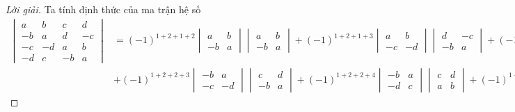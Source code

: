 \documentclass[class=nhvh-linear-algebra,crop=false]{standalone}
\begin{document}
\begin{proof}[Lời giải]
	\par Ta tính định thức của ma trận hệ số
	\begingroup{}
	\allowdisplaybreaks{}
	\begin{align*}
		\begin{vmatrix}
			a  & b  & c  & d  \\
			-b & a  & d  & -c \\
			-c & -d & a  & b  \\
			-d & c  & -b & a
		\end{vmatrix}
		 & = {(-1)}^{1+2+1+2}
		\begin{vmatrix}
			a  & b \\
			-b & a
		\end{vmatrix}
		\begin{vmatrix}
			a  & b \\
			-b & a
		\end{vmatrix}
		+ {(-1)}^{1+2+1+3}
		\begin{vmatrix}
			a  & b  \\
			-c & -d
		\end{vmatrix}
		\begin{vmatrix}
			d  & -c \\
			-b & a
		\end{vmatrix}
		+ {(-1)}^{1+2+1+4}
		\begin{vmatrix}
			a  & b \\
			-d & c
		\end{vmatrix}
		\begin{vmatrix}
			d & -c \\
			a & b
		\end{vmatrix}                                                                                                 \\
		 & + {(-1)}^{1+2+2+3}
		\begin{vmatrix}
			-b & a  \\
			-c & -d
		\end{vmatrix}
		\begin{vmatrix}
			c  & d \\
			-b & a
		\end{vmatrix}
		+ {(-1)}^{1+2+2+4}
		\begin{vmatrix}
			-b & a \\
			-d & c
		\end{vmatrix}
		\begin{vmatrix}
			c & d \\
			a & b
		\end{vmatrix}
		+ {(-1)}^{1+2+3+4}

\end{align*}
\end{proof}
\end{document}
